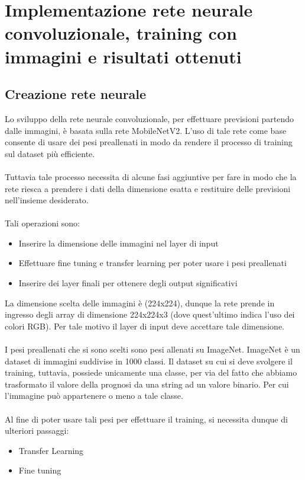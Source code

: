 \chapter{Implementazione rete neurale convoluzionale, training con immagini e risultati ottenuti}
\label{ch:CNN}
\section{Creazione rete neurale}
Lo sviluppo della rete neurale convoluzionale, per effettuare previsioni partendo dalle immagini, è basata sulla rete 
MobileNetV2. L'uso di tale rete come base consente di usare dei pesi preallenati in modo da rendere il processo di training sul dataset più efficiente.
\\\\
Tuttavia tale processo necessita di alcune fasi aggiuntive per fare in modo che la rete riesca a prendere i dati della dimensione esatta 
e restituire delle previsioni nell'insieme desiderato.
\\\\
Tali operazioni sono:
\begin{itemize}
    \item Inserire la dimensione delle immagini nel layer di input
    \item Effettuare fine tuning e transfer learning per poter usare i pesi preallenati 
    \item Inserire dei layer finali per ottenere degli output significativi
\end{itemize}

La dimensione scelta delle immagini è (224x224), dunque la rete prende in ingresso degli array di dimensione 224x224x3 (dove quest'ultimo indica l'uso dei colori RGB).
Per tale motivo il layer di input deve accettare tale dimensione.
\\\\
I pesi preallenati che si sono scelti sono pesi allenati su ImageNet. ImageNet è un dataset di immagini suddivise in 1000 classi. Il dataset su cui si deve svolgere il training, tuttavia, possiede 
unicamente una classe, per via del fatto che abbiamo trasformato il valore della prognosi da una string ad un valore binario. 
Per cui l'immagine può appartenere o meno a tale classe.
\\\\
Al fine di poter usare tali pesi per effettuare il training, si necessita dunque di ulteriori passaggi: 
\begin{itemize}
    \item Transfer Learning
    \item Fine tuning
\end{itemize}

